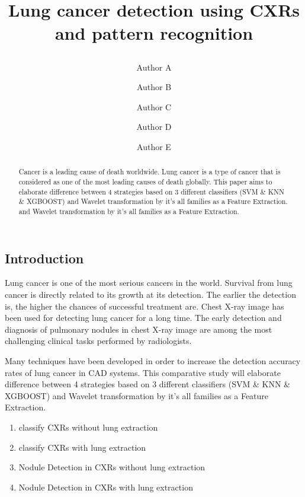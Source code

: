 \documentclass[hidelinks,12pt,xcolor=table]{article}
\title{Lung cancer detection using CXRs and pattern recognition
\date{}
}
\author[1]{Author A}
\author[1]{Author B}
\author[1]{Author C}
\author[1]{Author D}
\author[1]{Author E}
\affil[1]{Department of Computer Science, \LaTeX\ University}
\begin{document}
\maketitle
\begin{abstract}
Cancer is a leading cause of death worldwide.
Lung cancer is a type of cancer that is considered as one of the most leading causes of death globally.
This paper aims to elaborate difference between 4 strategies based on 3 different classifiers 
(SVM  \& KNN \& XGBOOST) and Wavelet transformation by it's all families as a Feature Extraction.
and Wavelet transformation by it’s all families as a Feature Extraction.
\end{abstract}

\begin{multicols}{2}
\section{Introduction}
Lung cancer is one of the most serious cancers in the world. Survival from lung cancer is
directly related to its growth at its detection. The earlier the detection is, the higher the
chances of successful treatment are. Chest X-ray image has been used for detecting lung
cancer for a long time. The early detection and diagnosis of pulmonary nodules in chest
X-ray image are among the most challenging clinical tasks performed by radiologists.

Many techniques have been developed in order to
increase the detection accuracy rates of lung cancer in CAD systems.
This comparative study will elaborate difference between 4 strategies based on 3 different classifiers (SVM  \& KNN \& XGBOOST) and Wavelet transformation by it's all families as a Feature Extraction.

\begin{enumerate}
\item classify CXRs without lung extraction
\item classify CXRs with lung extraction
\item Nodule Detection in CXRs without lung extraction
\item Nodule Detection in CXRs with lung extraction
\end{enumerate}

\end{multicols}
\end{document}
